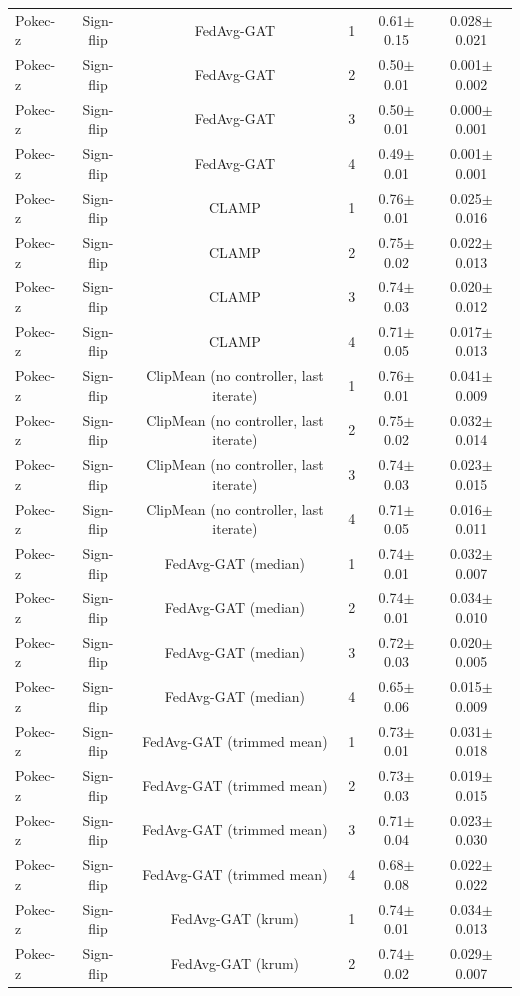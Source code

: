 \begin{table}[tbp]
\begin{tabular}{lccccc}
Pokec-z & Sign-flip & FedAvg-GAT & 1 & 0.61$\pm$0.15 & 0.028$\pm$0.021 \\
Pokec-z & Sign-flip & FedAvg-GAT & 2 & 0.50$\pm$0.01 & 0.001$\pm$0.002 \\
Pokec-z & Sign-flip & FedAvg-GAT & 3 & 0.50$\pm$0.01 & 0.000$\pm$0.001 \\
Pokec-z & Sign-flip & FedAvg-GAT & 4 & 0.49$\pm$0.01 & 0.001$\pm$0.001 \\
Pokec-z & Sign-flip & CLAMP & 1 & 0.76$\pm$0.01 & 0.025$\pm$0.016 \\
Pokec-z & Sign-flip & CLAMP & 2 & 0.75$\pm$0.02 & 0.022$\pm$0.013 \\
Pokec-z & Sign-flip & CLAMP & 3 & 0.74$\pm$0.03 & 0.020$\pm$0.012 \\
Pokec-z & Sign-flip & CLAMP & 4 & 0.71$\pm$0.05 & 0.017$\pm$0.013 \\
Pokec-z & Sign-flip & ClipMean (no controller, last iterate) & 1 & 0.76$\pm$0.01 & 0.041$\pm$0.009 \\
Pokec-z & Sign-flip & ClipMean (no controller, last iterate) & 2 & 0.75$\pm$0.02 & 0.032$\pm$0.014 \\
Pokec-z & Sign-flip & ClipMean (no controller, last iterate) & 3 & 0.74$\pm$0.03 & 0.023$\pm$0.015 \\
Pokec-z & Sign-flip & ClipMean (no controller, last iterate) & 4 & 0.71$\pm$0.05 & 0.016$\pm$0.011 \\
Pokec-z & Sign-flip & FedAvg-GAT (median) & 1 & 0.74$\pm$0.01 & 0.032$\pm$0.007 \\
Pokec-z & Sign-flip & FedAvg-GAT (median) & 2 & 0.74$\pm$0.01 & 0.034$\pm$0.010 \\
Pokec-z & Sign-flip & FedAvg-GAT (median) & 3 & 0.72$\pm$0.03 & 0.020$\pm$0.005 \\
Pokec-z & Sign-flip & FedAvg-GAT (median) & 4 & 0.65$\pm$0.06 & 0.015$\pm$0.009 \\
Pokec-z & Sign-flip & FedAvg-GAT (trimmed mean) & 1 & 0.73$\pm$0.01 & 0.031$\pm$0.018 \\
Pokec-z & Sign-flip & FedAvg-GAT (trimmed mean) & 2 & 0.73$\pm$0.03 & 0.019$\pm$0.015 \\
Pokec-z & Sign-flip & FedAvg-GAT (trimmed mean) & 3 & 0.71$\pm$0.04 & 0.023$\pm$0.030 \\
Pokec-z & Sign-flip & FedAvg-GAT (trimmed mean) & 4 & 0.68$\pm$0.08 & 0.022$\pm$0.022 \\
Pokec-z & Sign-flip & FedAvg-GAT (krum) & 1 & 0.74$\pm$0.01 & 0.034$\pm$0.013 \\
Pokec-z & Sign-flip & FedAvg-GAT (krum) & 2 & 0.74$\pm$0.02 & 0.029$\pm$0.007 \\

\end{tabular}
\end{table}
